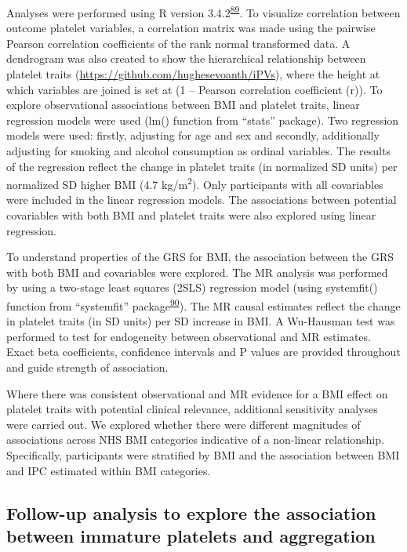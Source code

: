 \documentclass[11pt,twoside]{bristolthesis}
\begin{document}
Analyses were performed using R version 3.4.2\textsuperscript{\protect\hyperlink{ref-Team2019a}{89}}. To visualize correlation between outcome platelet variables, a correlation matrix was made using the pairwise Pearson correlation coefficients of the rank normal transformed data. A dendrogram was also created to show the hierarchical relationship between platelet traits (\url{https://github.com/hughesevoanth/iPVs}), where the height at which variables are joined is set at (1 -- Pearson correlation coefficient (r)). To explore observational associations between BMI and platelet traits, linear regression models were used (lm() function from ``stats'' package). Two regression models were used: firstly, adjusting for age and sex and secondly, additionally adjusting for smoking and alcohol consumption as ordinal variables. The results of the regression reflect the change in platelet traits (in normalized SD units) per normalized SD higher BMI (4.7 kg/m\textsuperscript{2}). Only participants with all covariables were included in the linear regression models. The associations between potential covariables with both BMI and platelet traits were also explored using linear regression.

To understand properties of the GRS for BMI, the association between the GRS with both BMI and covariables were explored. The MR analysis was performed by using a two-stage least squares (2SLS) regression model (using systemfit() function from ``systemfit'' package\textsuperscript{\protect\hyperlink{ref-Henningsen2007}{90}}). The MR causal estimates reflect the change in platelet traits (in SD units) per SD increase in BMI. A Wu-Hausman test was performed to test for endogeneity between observational and MR estimates. Exact beta coefficients, confidence intervals and P values are provided throughout and guide strength of association.

Where there was consistent observational and MR evidence for a BMI effect on platelet traits with potential clinical relevance, additional sensitivity analyses were carried out. We explored whether there were different magnitudes of associations across NHS BMI categories indicative of a non-linear relationship. Specifically, participants were stratified by BMI and the association between BMI and IPC estimated within BMI categories.

\hypertarget{follow-up-analysis-to-explore-the-association-between-immature-platelets-and-aggregation}{%
\subsection{Follow-up analysis to explore the association between immature platelets and aggregation}\label{follow-up-analysis-to-explore-the-association-between-immature-platelets-and-aggregation}}
\end{document}
